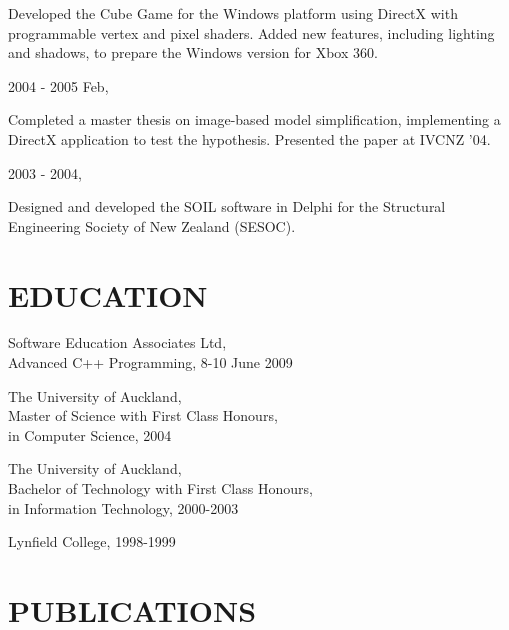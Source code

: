\begin{resume}
Developed the Cube Game for the Windows platform using DirectX with programmable vertex and pixel shaders. Added new features, including lighting and shadows, to prepare the Windows version for Xbox 360.

\begin{minipage}{\textwidth}
\vspace{0.03in}
\hspace*{-0.25in} 2004 - 2005 Feb,
\vspace{0.165in}

Completed a master thesis on image-based model simplification, implementing a DirectX application to test the hypothesis. Presented the paper at IVCNZ '04.
\end{minipage}

\hspace*{-0.25in} 2003 - 2004,

Designed and developed the SOIL software in Delphi for the Structural Engineering Society of New Zealand (SESOC).

\begin{minipage}{\textwidth}
\vspace{0.03in}
\section{EDUCATION}
\vspace{0.165in}

Software Education Associates Ltd,\\
Advanced C++ Programming, 8-10 June 2009
\end{minipage}

The University of Auckland,\\
Master of Science with First Class Honours,\\
in Computer Science, 2004 
 
The University of Auckland,\\
Bachelor of Technology with First Class Honours,\\
in Information Technology, 2000-2003 
 
Lynfield College, 1998-1999 

\begin{minipage}{\textwidth}
\vspace{0.03in}
\section{PUBLICATIONS} 
\vspace{0.115in}


\end{minipage}
\end{resume}
